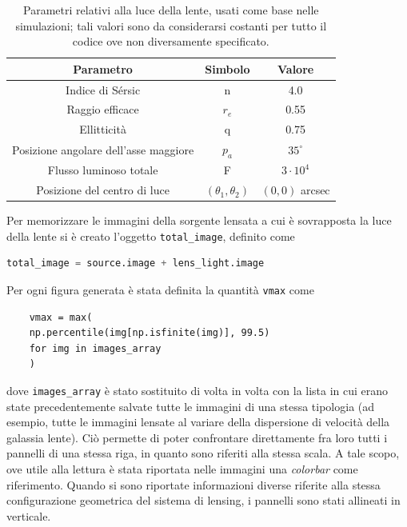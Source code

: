 \begin{table}[]
\centering
\begin{tabular}{|c|c|c|}
\hline
\textbf{Parametro}                    & \textbf{Simbolo}       & \textbf{Valore} \\ \hline
Indice di Sérsic                      & n                      & 4.0             \\ \hline
Raggio efficace                       & $r_e$                  & 0.55            \\ \hline
Ellitticità                           & q                      & 0.75            \\ \hline
Posizione angolare dell'asse maggiore & $p_a$                  & $35^\circ$      \\ \hline
Flusso luminoso totale                & F                      & $3 \cdot 10^4$  \\ \hline
Posizione del centro di luce          & $(\theta_1, \theta_2)$ & $(0,0)$ arcsec  \\ \hline
\end{tabular}
\caption{Parametri relativi alla luce della lente, usati come base nelle simulazioni; tali valori sono da considerarsi costanti per tutto il codice ove non diversamente specificato.}
\label{tab:lens_light_par_sim}
\end{table}
Per memorizzare le immagini della sorgente lensata a cui è sovrapposta la luce della lente si è creato l'oggetto \texttt{total\_image}, definito come
\begin{lstlisting}[language=Python]
    total_image = source.image + lens_light.image
\end{lstlisting}

Per ogni figura generata è stata definita la quantità \texttt{vmax} come
\begin{lstlisting}
    vmax = max(
    np.percentile(img[np.isfinite(img)], 99.5)
    for img in images_array
    )
\end{lstlisting}
dove \texttt{images\_array} è stato sostituito di volta in volta con la lista in cui erano state precedentemente salvate tutte le immagini di una stessa tipologia  (ad esempio, tutte le immagini lensate al variare della dispersione di velocità della galassia lente). Ciò permette di poter confrontare direttamente fra loro tutti i pannelli di una stessa riga, in quanto sono riferiti alla stessa scala. A tale scopo, ove utile alla lettura è stata riportata nelle immagini una \emph{colorbar} come riferimento. Quando si sono riportate informazioni diverse riferite alla stessa configurazione geometrica del sistema di lensing, i pannelli sono stati allineati in verticale. 

